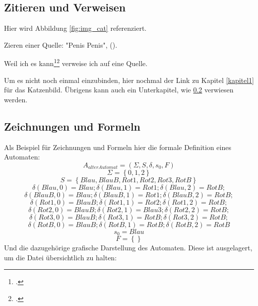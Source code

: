 \documentclass[../main.tex]{subfiles}
\begin{document}
\subsection{Zitieren und Verweisen}
\label{zitieren_und_verweisen}
Hier wird Abbildung \ref{fig:img_cat} referenziert.

Zieren einer Quelle: "Penis Penis", (\cite[Seite 11]{theoretischeinformatik}).

Weil ich es kann\footcite{spektumperformance}\footcite{raspberrypischematics} verweise ich auf eine Quelle. %

Um es nicht noch einmal einzubinden, hier nochmal der Link zu Kapitel \ref{kapitel1} für das Katzenbild. Übrigens kann auch ein Unterkapitel, wie \ref{zeichnungen_und_formeln} verwiesen werden.

\subsection{Zeichnungen und Formeln}
\label{zeichnungen_und_formeln}
Als Beispiel für Zeichnungen und Formeln hier die formale Definition eines Automaten:
$$A_{alterAutomat} = (\Sigma, S, \delta, s_{0}, F)$$
$$\Sigma = \left\{0, 1, 2\right\}$$
$$S = \left\{Blau, BlauB, Rot1, Rot2, Rot3, RotB\right\}$$
$$\delta(Blau, 0) = Blau; \delta(Blau, 1) = Rot1; \delta(Blau, 2) = RotB;$$
$$\delta(BlauB, 0) = Blau; \delta(BlauB, 1) = Rot1; \delta(BlauB, 2) = RotB;$$
$$\delta(Rot1, 0) = BlauB; \delta(Rot1, 1) = Rot2; \delta(Rot1, 2) = RotB;$$
$$\delta(Rot2, 0) = BlauB; \delta(Rot2, 1) = Blau3; \delta(Rot2, 2) = RotB;$$
$$\delta(Rot3, 0) = BlauB; \delta(Rot3, 1) = RotB; \delta(Rot3, 2) = RotB;$$
$$\delta(RotB, 0) = BlauB; \delta(RotB, 1) = RotB; \delta(RotB, 2) = RotB$$
$$s_{0} = Blau$$
$$F = \left\{\right\}$$
Und die dazugehörige grafische Darstellung des Automaten. Diese ist ausgelagert, um die Datei übersichtlich zu halten:


\end{document}
